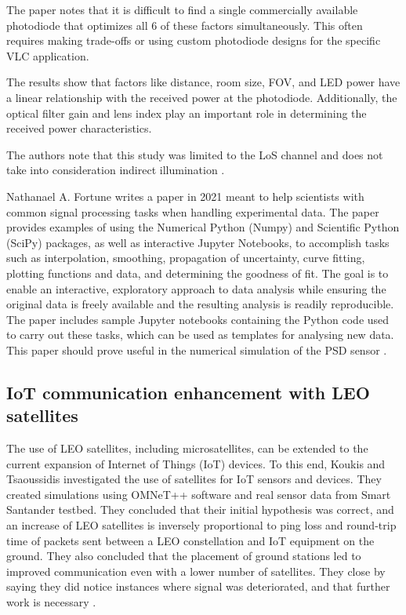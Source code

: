 The paper notes that it is difficult to find a single commercially available photodiode that optimizes all 6 of these factors simultaneously. This often requires making trade-offs or using custom photodiode designs for the specific VLC application.

The results show that factors like distance, room size, FOV, and LED power have a linear relationship with the received power at the photodiode. Additionally, the optical filter gain and lens index play an important role in determining the received power characteristics.

The authors note that this study was limited to the LoS channel and does not take into consideration indirect illumination \cite{Fueda2017}.

Nathanael A. Fortune writes a paper in 2021 meant to help scientists with common signal processing tasks when handling experimental data. The paper provides examples of using the Numerical Python (Numpy) and Scientific Python (SciPy) packages, as well as interactive Jupyter Notebooks, to accomplish tasks such as interpolation, smoothing, propagation of uncertainty, curve fitting, plotting functions and data, and determining the goodness of fit. The goal is to enable an interactive, exploratory approach to data analysis while ensuring the original data is freely available and the resulting analysis is readily reproducible. The paper includes sample Jupyter notebooks containing the Python code used to carry out these tasks, which can be used as templates for analysing new data. This paper should prove useful in the numerical simulation of the PSD sensor \cite{Fortune2021}.

\subsection{IoT communication enhancement with LEO satellites}
The use of LEO satellites, including microsatellites, can be extended to the current expansion of Internet of Things (IoT) devices. To this end, Koukis and Tsaoussidis investigated the use of satellites for IoT sensors and devices. They created simulations using OMNeT++ software and real sensor data from Smart Santander testbed. They concluded that their initial hypothesis was correct, and an increase of LEO satellites is inversely proportional to ping loss and round-trip time of packets sent between a LEO constellation and IoT equipment on the ground. They also concluded that the placement of ground stations led to improved communication even with a lower number of satellites. They close by saying they did notice instances where signal was deteriorated, and that further work is necessary \cite{Koukis2023}.

%
%
